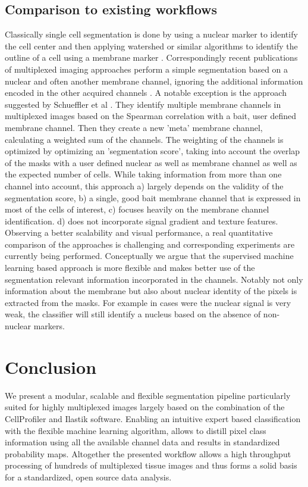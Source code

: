 \documentclass[a4paper]{article}
\begin{document}
\subsection{Comparison to existing workflows}
Classically single cell segmentation is done by using a nuclear marker to identify the cell center
and then applying watershed or similar algorithms to identify the outline of a cell using a
membrane marker \cite{carpenter_cellprofiler:_2006}. Correspondingly recent publications of multiplexed imaging
approaches perform a simple segmentation based on a nuclear and often another membrane channel, ignoring the
additional information encoded in the other acquired channels \cite{lin_highly_2015,
angelo_multiplexed_2014}.
A notable exception is the approach suggested by Schueffler et al \cite{schuffler_automatic_2015}. They identify
multiple membrane channels in multiplexed images based on the Spearman correlation with a bait, user
defined membrane channel. Then they create a new 'meta' membrane channel, calculating a weighted
sum of the channels. The weighting of the channels is optimized by optimizing an 'segmentation
score', taking into account the overlap of the masks with a user defined nuclear as well as membrane channel as well as the expected number of
cells. While taking information from more than one channel into account, this approach a) largely
depends on the validity of the segmentation score, b) a single, good bait membrane channel that is expressed
in most of the cells of interest, c) focuses heavily on the membrane channel identification. d)
does not incorporate signal gradient and texture features.
Observing a better scalability and visual performance,  a real quantitative comparison of the approaches
is challenging and corresponding experiments are currently being performed. Conceptually we argue that the supervised machine
learning based approach is more flexible and makes better use of the segmentation relevant
information incorporated in the channels. Notably not only information about the membrane but also
about nuclear identity of the pixels is extracted from the masks. For example in cases were the
nuclear signal is very weak, the classifier will still identify a nucleus based on the absence of
non-nuclear markers.


\section{Conclusion}
We present a modular, scalable and flexible segmentation pipeline particularly suited for highly
multiplexed images largely based on the combination of the CellProfiler and Ilastik software.
Enabling an intuitive expert based classification with the flexible machine learning algorithm,
allows to distill pixel class information using all the available channel data and results in
standardized probability maps. Altogether the presented workflow allows a high throughput
processing of hundreds of multiplexed tissue images and thus forms a solid basis for a
standardized, open source data analysis.



\end{document}
